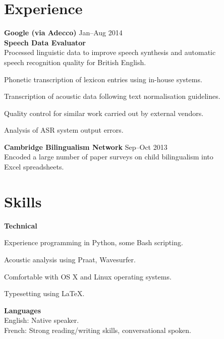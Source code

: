 \documentclass[margin, line, 12pt]{res}
\begin{document}
\begin{resume}

\section{Experience}
{\bf Google (via Adecco)}  \hfill Jan--Aug 2014 \\
{\bf Speech Data Evaluator} \\
Processed linguistic data to improve speech synthesis and automatic \\ speech recognition quality for British English. \smallskip
\begin{itemize}[leftmargin=*] \itemsep -2pt  %
 {\small  
 \item Phonetic transcription of lexicon entries using in-house systems.
\item Transcription of acoustic data following text normalisation guidelines.
\item Quality control for similar work carried out by external vendors.
\item Analysis of ASR system output errors.
 }
 \end{itemize}

{\bf Cambridge Bilingualism Network} \hfill Sep--Oct 2013 \\
{\small  
Encoded a large number of paper surveys on child bilingualism into \\ Excel spreadsheets.
}


\section{Skills}
{\bf Technical}
\begin{itemize}[leftmargin=*] \itemsep -2pt
{\small
\item Experience programming in Python, some Bash scripting.
\item Acoustic analysis using Praat, Wavesurfer.
\item Comfortable with OS X and Linux operating systems.
\item Typesetting using \LaTeX.
}
\end{itemize}

{\bf Languages} \\
{\small
English: Native speaker. \\
French: Strong reading/writing skills, conversational spoken.
}

\end{resume} 
\end{document}
